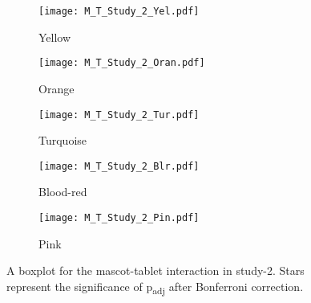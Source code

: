 \begin{figure}[hbt!]
    \centering
    \begin{subfigure}{.40\textwidth}
        \centering
        \texttt{[image: M\_T\_Study\_2\_Yel.pdf]}
        \caption{Yellow}
        \label{fig:sub1}
    \end{subfigure}\hfill%
    \begin{subfigure}{.40\textwidth}
        \centering
        \texttt{[image: M\_T\_Study\_2\_Oran.pdf]}
        \caption{Orange}
        \label{fig:sub2}
    \end{subfigure}\hfill
    \begin{subfigure}{.40\textwidth}
        \centering
        \texttt{[image: M\_T\_Study\_2\_Tur.pdf]}
        \caption{Turquoise}
        \label{fig:sub1}
    \end{subfigure}\hfill%
    \begin{subfigure}{.40\textwidth}
        \centering
        \texttt{[image: M\_T\_Study\_2\_Blr.pdf]}
        \caption{Blood-red}
        \label{fig:sub1}
    \end{subfigure}\hfill%
    \begin{subfigure}{.40\textwidth}
        \centering
        \texttt{[image: M\_T\_Study\_2\_Pin.pdf]}
        \caption{Pink}
        \label{fig:sub1}
    \end{subfigure}\hfill%
    \caption{A boxplot for the mascot-tablet interaction in study-2.
    Stars represent the significance of p\textsubscript{adj} after Bonferroni correction.}
    \label{fig:MT2}
\end{figure}

